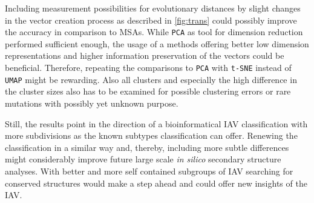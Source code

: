 \vspace{1em}

Including measurement possibilities for evolutionary distances by slight changes in the vector creation process as described in \autoref{fig:trans} could possibly improve the accuracy in comparison to \glspl{MSA}. %
While \texttt{PCA} as tool for dimension reduction performed sufficient enough, the usage of a methods offering better low dimension representations and higher information preservation of the vectors could be beneficial. Therefore, repeating the comparisons to \texttt{PCA} with \texttt{t-SNE} instead of \texttt{UMAP} might be rewarding. Also all clusters and especially the high difference in the cluster sizes also has to be examined for possible clustering errors or rare mutations with possibly yet unknown purpose. 

\vspace{1em}

Still, the results point in the direction of a bioinformatical \gls{IAV} classification with more subdivisions as the known subtypes classification can offer. Renewing the classification in a similar way and, thereby, including more subtle differences might considerably improve future large scale  \textit{in silico} secondary structure analyses. With better and more self contained subgroups of \gls{IAV} searching for conserved structures would make a step ahead and could offer new insights of the \gls{IAV}.






